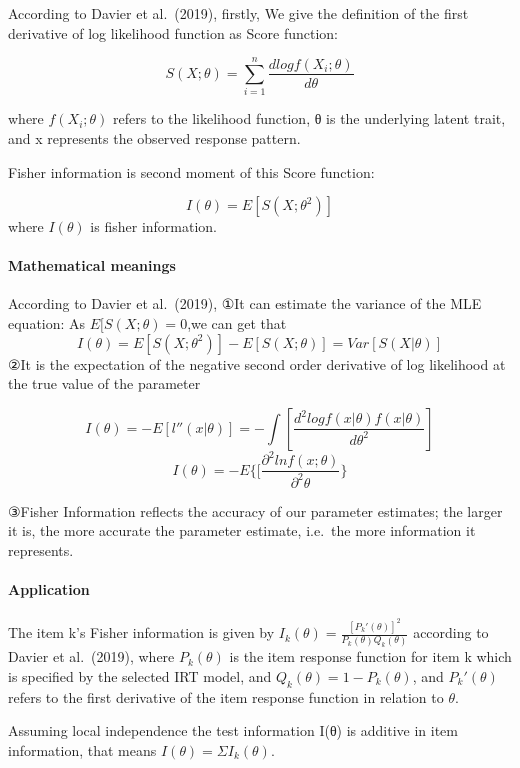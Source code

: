 \documentclass[
]{article}
\begin{document}
According to Davier et al.~(2019), firstly, We give the definition of
the first derivative of log likelihood function as Score function:

\[S(X;\theta)=\sum_{i=1}^n\frac{dlogf(X_i;\theta)}{d\theta}\]

where \(f(X_i;\theta)\) refers to the likelihood function, θ is the
underlying latent trait, and x represents the observed response pattern.

Fisher information is second moment of this Score function:

\[I(\theta)=E[S(X;\theta^2)]\] where \(I(\theta)\) is fisher
information.

\hypertarget{mathematical-meanings}{%
\paragraph{Mathematical meanings}\label{mathematical-meanings}}

According to Davier et al.~(2019), ①It can estimate the variance of the
MLE equation: As \(E[S(X;\theta)=0\),we can get that
\[I(\theta)=E[S(X;\theta^2)]-E[S(X;\theta)]=Var[S(X|\theta)]\] ②It is
the expectation of the negative second order derivative of log
likelihood at the true value of the parameter

\[I(\theta)=-E[l''(x|\theta)]=-\int[\frac{d^2logf(x|\theta)f(x|\theta)}{d\theta^2}]\]
\[I(\theta)=-E\lbrace[\frac  {\partial^2 ln f(x;\theta)}{\partial^2 \theta} \rbrace\]

③Fisher Information reflects the accuracy of our parameter estimates;
the larger it is, the more accurate the parameter estimate, i.e.~the
more information it represents.

\hypertarget{application}{%
\paragraph{Application}\label{application}}

The item k's Fisher information is given by
\(I_k(\theta)=\frac {[P_k'(\theta)]^2}{P_k(\theta)Q_k(\theta)}\)
according to Davier et al.~(2019), where \(P_k(\theta)\) is the item
response function for item k which is specified by the selected IRT
model, and \(Q_k(θ) = 1 − P_k(θ)\), and \(P_k' (θ)\) refers to the first
derivative of the item response function in relation to \(\theta\).

Assuming local independence the test information I(θ) is additive in
item information, that means \(I(\theta)=\Sigma I_k(\theta)\).
\end{document}
